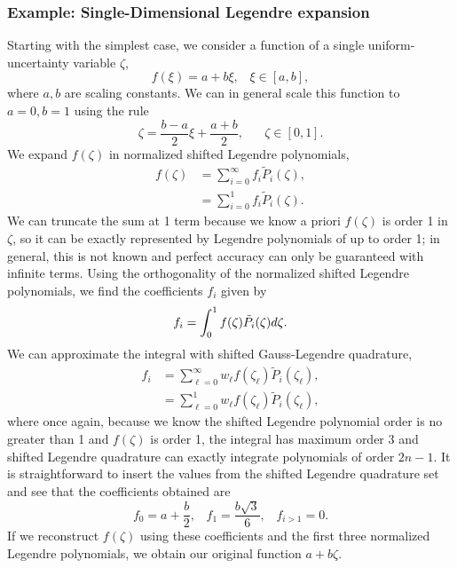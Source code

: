 \subsubsection{Example: Single-Dimensional Legendre expansion}
Starting with the simplest case, we consider a function of a single uniform-uncertainty variable $\zeta$,
\begin{equation}
f(\xi)=a+b\xi, \hspace{10pt}\xi\in[a,b],
\end{equation}
where $a,b$ are scaling constants.  We can in general scale this function to $a=0,b=1$ using the rule
\begin{equation}
\zeta=\frac{b-a}{2}\xi+\frac{a+b}{2},\hspace{20pt}\zeta\in[0,1].
\end{equation}
We expand $f(\zeta)$ in normalized shifted Legendre polynomials,
\begin{align}
f(\zeta)&=\sum_{i=0}^\infty f_i\tilde P_i(\zeta),\\
 &= \sum_{i=0}^1 f_i\tilde P_i(\zeta).
\end{align}
We can truncate the sum at 1 term because we know a priori $f(\zeta)$ is order 1 in $\zeta$, so it can be exactly represented by Legendre polynomials of up to order 1; in general, this is not known and perfect accuracy can only be guaranteed with infinite terms.  Using the orthogonality of the normalized shifted Legendre polynomials, we find the coefficients $f_i$ given by
\begin{equation}
f_i=\int_0^1 f(\zeta)\tilde P_i(\zeta)d\zeta.
\end{equation}
We can approximate the integral with shifted Gauss-Legendre quadrature,
\begin{align}
f_i&=\sum_{\ell=0}^\infty w_\ell f(\zeta_\ell)\tilde P_i(\zeta_\ell),\\
 &=\sum_{\ell=0}^1 w_\ell f(\zeta_\ell)\tilde P_i(\zeta_\ell),
\end{align}
where once again, because we know the shifted Legendre polynomial order is no greater than 1 and $f(\zeta)$ is order 1, the integral has maximum order 3 and shifted Legendre quadrature can exactly integrate polynomials of order $2n-1$.  It is straightforward to insert the values from the shifted Legendre quadrature set and see that the coefficients obtained are
\begin{equation}
f_0=a+\frac{b}{2},\hspace{10pt} f_1=\frac{b\sqrt{3}}{6},\hspace{10pt} f_{i>1}=0.
\end{equation}
If we reconstruct $f(\zeta)$ using these coefficients and the first three normalized Legendre polynomials, we obtain our original function $a+b\zeta$.

